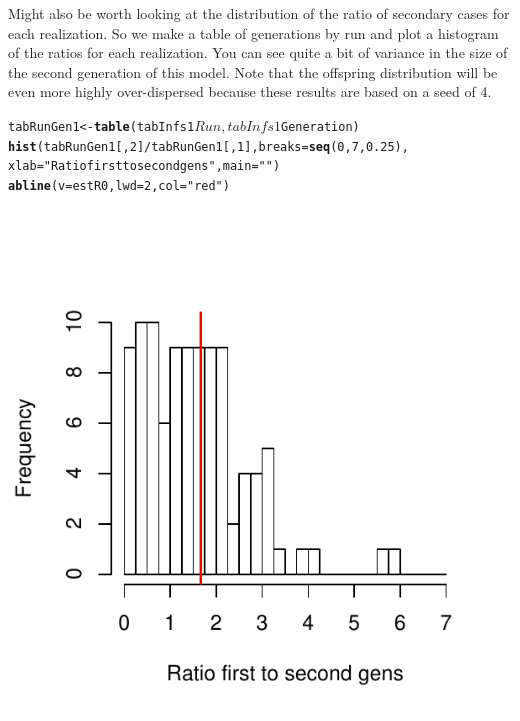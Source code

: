 \documentclass{article}\usepackage{graphicx, color}
\makeatletter
\newcommand{\hlfunctioncall}[1]{\textcolor[rgb]{0.501960784313725,0,0.329411764705882}{\textbf{#1}}}%
\newcommand{\hlstring}[1]{\textcolor[rgb]{0.6,0.6,1}{#1}}%
\newenvironment{kframe}{%
 \def\at@end@of@kframe{}%
 \ifinner\ifhmode%
  \def\at@end@of@kframe{\end{minipage}}%
  \begin{minipage}{\columnwidth}%
 \fi\fi%
 \def\FrameCommand##1{\hskip\@totalleftmargin \hskip-\fboxsep
 \colorbox{shadecolor}{##1}\hskip-\fboxsep
     \hskip-\linewidth \hskip-\@totalleftmargin \hskip\columnwidth}%
 \MakeFramed {\advance\hsize-\width
   \@totalleftmargin\z@ \linewidth\hsize
   \@setminipage}}%
 {\par\unskip\endMakeFramed%
 \at@end@of@kframe}
\newenvironment{knitrout}{}{} %
\makeatother
\begin{document}
Might also be worth looking at the distribution of the ratio of secondary cases
for each realization. So we make a table of generations by run and plot a
histogram of the ratios for each realization. You can see quite a bit of
variance in the size of the second generation of this model. Note that the
offspring distribution will be even more highly over-dispersed because these
results are based on a seed of 4.

\begin{knitrout}
\color{fgcolor}\begin{kframe}
\begin{alltt}
tabRunGen1 <- \hlfunctioncall{table}(tabInfs1$Run,tabInfs1$Generation)
\hlfunctioncall{hist}( tabRunGen1[,2]/tabRunGen1[,1],breaks=\hlfunctioncall{seq}(0,7,0.25),
      xlab=\hlstring{"Ratio first to second gens"},main=\hlstring{""})
\hlfunctioncall{abline}(v=estR0,lwd=2,col=\hlstring{"red"})	
\end{alltt}
\end{kframe}

{\centering \includegraphics[width=\textwidth]{figs/unnamed-chunk-10} 

}



\end{knitrout}
\end{document}
